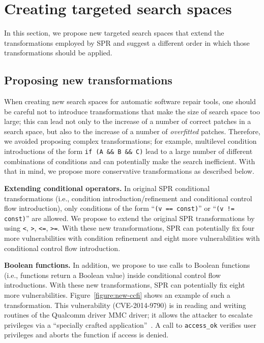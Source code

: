 \section{Creating targeted search spaces}

In this section, we propose new targeted search spaces that extend the transformations employed by SPR and suggest a different order in which those transformations should be applied.

\subsection{Proposing new transformations}

When creating new search spaces for automatic software repair tools, one should be careful not to introduce transformations that make the size of search space too large; this can lead not only to the increase of a number of correct patches in a search space, but also to the increase of a number of \emph{overfitted} patches. Therefore, we avoided proposing complex transformations; for example, multilevel condition introductions of the form \texttt{if (A \&\& B \&\& C)} lead to a large number of different combinations of conditions and can potentially make the search inefficient. With that in mind, we propose more conservative transformations as described below.

\textbf{Extending conditional operators.} In original SPR conditional transformations (i.e., condition introduction/refinement and conditional control flow introduction), only conditions of the form ``\texttt{(v == const)}'' or ``\texttt{(v != const)}'' are allowed. We propose to extend the original SPR transformations by using \texttt{<}, \texttt{>}, \texttt{<=}, \texttt{>=}. With these new transformations, SPR can potentially fix four more vulnerabilities with condition refinement and eight more vulnerabilities with conditional control flow introduction.

\textbf{Boolean functions.} In addition, we propose to use calls to Boolean functions (i.e., functions return a Boolean value) inside conditional control flow introductions. With these new transformations, SPR can potentially fix eight more vulnerabilities. Figure~\ref{figure:new-ccfi} shows an example of such a transformation. This vulnerability (CVE-2014-9790) is in reading and writing routines of the Qualcomm driver MMC driver; it allows the attacker to escalate privileges via a ``specially crafted application''~\cite{cve-2014-9790}. A call to \texttt{access\_ok} verifies user privileges and aborts the function if access is denied.

